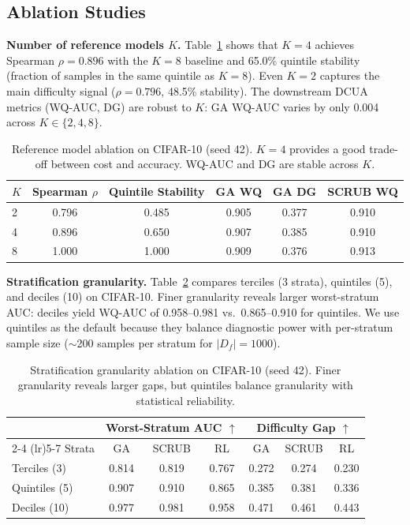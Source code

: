 \documentclass{article}
\begin{document}
\subsection{Ablation Studies}

\textbf{Number of reference models $K$.}
Table~\ref{tab:ablation_K} shows that $K=4$ achieves Spearman $\rho = 0.896$ with the $K=8$ baseline and 65.0\% quintile stability (fraction of samples in the same quintile as $K=8$).
Even $K=2$ captures the main difficulty signal ($\rho = 0.796$, 48.5\% stability).
The downstream DCUA metrics (WQ-AUC, DG) are robust to $K$: GA WQ-AUC varies by only 0.004 across $K \in \{2, 4, 8\}$.

\begin{table}[t]
\caption{Reference model ablation on CIFAR-10 (seed 42). $K=4$ provides a good trade-off between cost and accuracy. WQ-AUC and DG are stable across $K$.}
\label{tab:ablation_K}
\centering
\small
\begin{tabular}{lccccc}
\toprule
$K$ & Spearman $\rho$ & Quintile Stability & GA WQ & GA DG & SCRUB WQ \\
\midrule
2 & 0.796 & 0.485 & 0.905 & 0.377 & 0.910 \\
4 & 0.896 & 0.650 & 0.907 & 0.385 & 0.910 \\
8 & 1.000 & 1.000 & 0.909 & 0.376 & 0.913 \\
\bottomrule
\end{tabular}
\end{table}

\textbf{Stratification granularity.}
Table~\ref{tab:ablation_strata} compares terciles (3 strata), quintiles (5), and deciles (10) on CIFAR-10.
Finer granularity reveals larger worst-stratum AUC: deciles yield WQ-AUC of 0.958--0.981 vs.\ 0.865--0.910 for quintiles.
We use quintiles as the default because they balance diagnostic power with per-stratum sample size ($\sim$200 samples per stratum for $|D_f|=1000$).

\begin{table}[t]
\caption{Stratification granularity ablation on CIFAR-10 (seed 42). Finer granularity reveals larger gaps, but quintiles balance granularity with statistical reliability.}
\label{tab:ablation_strata}
\centering
\small
\begin{tabular}{lccc ccc}
\toprule
& \multicolumn{3}{c}{Worst-Stratum AUC $\uparrow$} & \multicolumn{3}{c}{Difficulty Gap $\uparrow$} \\
\cmidrule(lr){2-4} \cmidrule(lr){5-7}
Strata & GA & SCRUB & RL & GA & SCRUB & RL \\
\midrule
Terciles (3) & 0.814 & 0.819 & 0.767 & 0.272 & 0.274 & 0.230 \\
Quintiles (5) & 0.907 & 0.910 & 0.865 & 0.385 & 0.381 & 0.336 \\
Deciles (10) & 0.977 & 0.981 & 0.958 & 0.471 & 0.461 & 0.443 \\
\bottomrule
\end{tabular}
\end{table}
\end{document}
